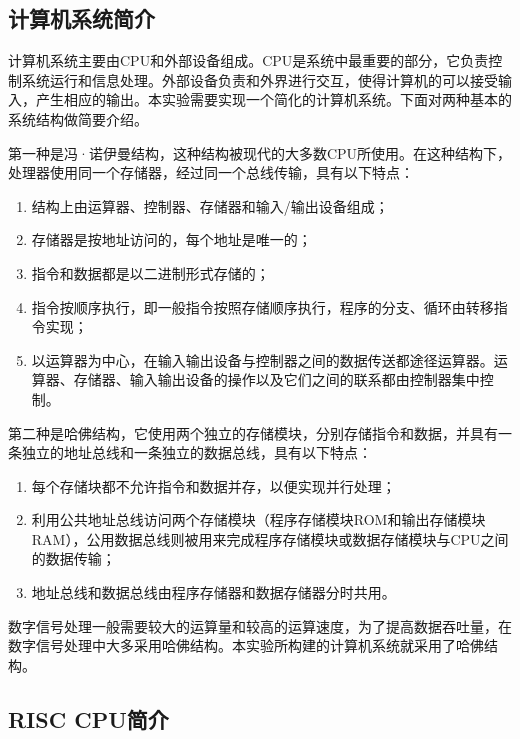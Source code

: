 \documentclass[titlepage, 11pt]{article}
\begin{document}
	\subsection{计算机系统简介}
	计算机系统主要由CPU和外部设备组成。CPU是系统中最重要的部分，它负责控制系统运行和信息处理。外部设备负责和外界进行交互，使得计算机的可以接受输入，产生相应的输出。本实验需要实现一个简化的计算机系统。下面对两种基本的系统结构做简要介绍。\par 
	第一种是冯·诺伊曼结构，这种结构被现代的大多数CPU所使用。在这种结构下，处理器使用同一个存储器，经过同一个总线传输，具有以下特点：
	\begin{enumerate}
		\item 结构上由运算器、控制器、存储器和输入/输出设备组成；
		\item 存储器是按地址访问的，每个地址是唯一的；
		\item 指令和数据都是以二进制形式存储的；
		\item 指令按顺序执行，即一般指令按照存储顺序执行，程序的分支、循环由转移指令实现；
		\item 以运算器为中心，在输入输出设备与控制器之间的数据传送都途径运算器。运算器、存储器、输入输出设备的操作以及它们之间的联系都由控制器集中控制。
	\end{enumerate}\par 
	第二种是哈佛结构，它使用两个独立的存储模块，分别存储指令和数据，并具有一条独立的地址总线和一条独立的数据总线，具有以下特点：
	\begin{enumerate}
		\item 每个存储块都不允许指令和数据并存，以便实现并行处理；
		\item 利用公共地址总线访问两个存储模块（程序存储模块ROM和输出存储模块RAM），公用数据总线则被用来完成程序存储模块或数据存储模块与CPU之间的数据传输；
		\item 地址总线和数据总线由程序存储器和数据存储器分时共用。
	\end{enumerate}\par 
	数字信号处理一般需要较大的运算量和较高的运算速度，为了提高数据吞吐量，在数字信号处理中大多采用哈佛结构。本实验所构建的计算机系统就采用了哈佛结构。
	\subsection{RISC CPU简介}
\end{document}
